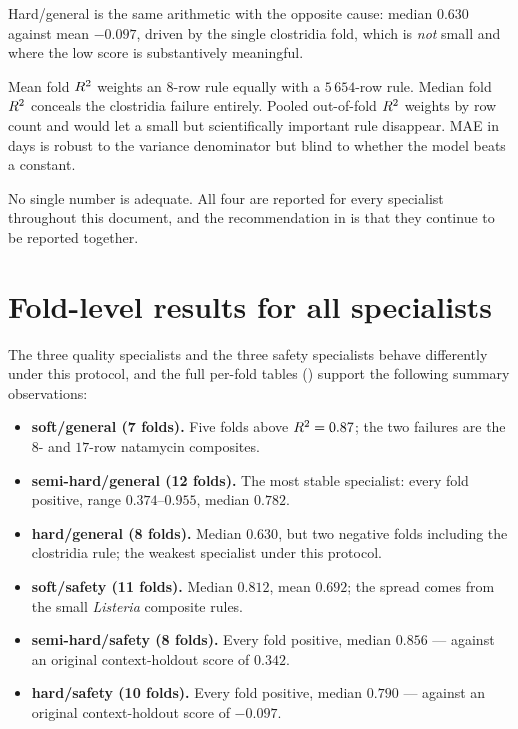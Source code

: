 Hard/general is the same arithmetic with the opposite cause: median $0.630$
against mean $-0.097$, driven by the single clostridia fold, which is
\emph{not} small and where the low score is substantively meaningful.

\begin{findingbox}[title={Why this report never quotes one summary alone}]
Mean fold $R^2$ weights an $8$-row rule equally with a $5\,654$-row rule.
Median fold $R^2$ conceals the clostridia failure entirely. Pooled
out-of-fold $R^2$ weights by row count and would let a small but
scientifically important rule disappear. MAE in days is robust to the
variance denominator but blind to whether the model beats a constant.

No single number is adequate. All four are reported for every specialist
throughout this document, and the recommendation in  is
that they continue to be reported together.
\end{findingbox}

\section{Fold-level results for all specialists}

The three quality specialists and the three safety specialists behave
differently under this protocol, and the full per-fold tables
()
support the following summary observations:

\begin{itemize}[leftmargin=1.3em, itemsep=2pt]
\item \textbf{soft/general (7 folds).} Five folds above $R^2 = 0.87$; the
  two failures are the $8$- and $17$-row natamycin composites.
\item \textbf{semi-hard/general (12 folds).} The most stable specialist:
  every fold positive, range $0.374$--$0.955$, median $0.782$.
\item \textbf{hard/general (8 folds).} Median $0.630$, but two negative
  folds including the clostridia rule; the weakest specialist under this
  protocol.
\item \textbf{soft/safety (11 folds).} Median $0.812$, mean $0.692$; the
  spread comes from the small \emph{Listeria} composite rules.
\item \textbf{semi-hard/safety (8 folds).} Every fold positive, median
  $0.856$ --- against an original context-holdout score of $0.342$.
\item \textbf{hard/safety (10 folds).} Every fold positive, median $0.790$
  --- against an original context-holdout score of $-0.097$.
\end{itemize}

